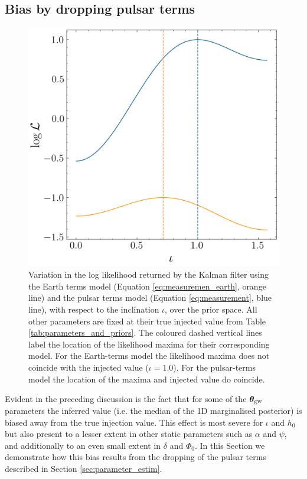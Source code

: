 \documentclass[fleqn,usenatbib,useAMS]{mnras}
\begin{document}
\subsection{Bias by dropping pulsar terms}\label{sec:bias}
\begin{figure}
	\centering
	\includegraphics[width=\columnwidth]{images/iota_likelihood_surface}
	\caption{Variation in the log likelihood returned by the Kalman filter using the Earth terms model (Equation \ref{eq:measuremen_earth}, orange line) and the pulsar terms model (Equation \ref{eq:measurement}, blue line), with respect to the inclination $\iota$, over the prior space. All other parameters are fixed at their true injected value from Table \ref{tab:parameters_and_priors}. The coloured dashed vertical lines label the location of the likelihood maxima for their corresponding model. For the Earth-terms model the likelihood maxima does not coincide with the injected value ($\iota = 1.0$). For the pulsar-terms model the location of the maxima and injected value do coincide.}
	\label{fig:likelihood_surface_iota}
\end{figure}
Evident in the preceding discussion is the fact that for some of the $\boldsymbol{\theta}_{\rm gw}$ parameters the inferred value (i.e. the median of the 1D marginalised posterior) is biased away from the true injection value. This effect is most severe for $\iota$ and $h_0$ but also present to a lesser extent in other static parameters such as $\alpha$ and $\psi$, and additionally to an even small extent in $\delta$ and $\Phi_0$. In this Section we demonstrate how this bias results from the dropping of the pulsar terms described in Section \ref{sec:parameter_estim}. \newline 
\end{document}
